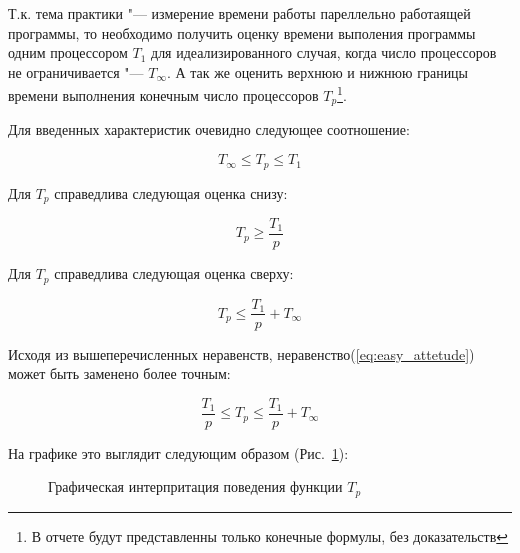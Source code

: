 \documentclass{article}
\begin{document}
			Т.к. тема практики "--- измерение времени работы пареллельно работаящей программы, то необходимо получить оценку    			времени выполения программы одним процессором $T_1$  для идеализированного случая, когда число процессоров не 						ограничивается "--- $T_\infty$. А так же оценить верхнюю и нижнюю границы времени выполнения конечным число процессоров 			$T_p$\footnote{В отчете будут представленны только конечные формулы, без доказательств}.
						
		Для введенных характеристик очевидно следующее соотношение:

		\begin{equation}
			\label{eq:easy_attetude}
			T_\infty \le T_p \le T_1
		\end{equation}
			
		Для $T_p$ справедлива следующая оценка снизу:
			
		\begin{equation}
			\label{eq:lower_bound}
			T_p \ge \frac{T_1}{p}
		\end{equation}
			
		Для $T_p$ справедлива следующая оценка сверху:
			
		\begin{equation}
			\label{eq:upper_bound}
			T_p \le \frac{T_1}{p} + T_\infty
		\end{equation}
			
		Исходя из вышеперечисленных неравенств, неравенство(\ref{eq:easy_attetude}) может быть заменено более точным:
			
		\begin{equation}
			\label{eq:attetude}
			\frac{T_1}{p} \le T_p \le \frac{T_1}{p} + T_\infty
		\end{equation}
			
		

		На графике это выглядит следующим образом (Рис.~\ref{ris:graph_attetude}):
			
		\begin{figure}[h!]
			\caption{Графическая интерпритация поведения функции $T_p$}
			\label{ris:graph_attetude}
		\end{figure}
						
\end{document}
